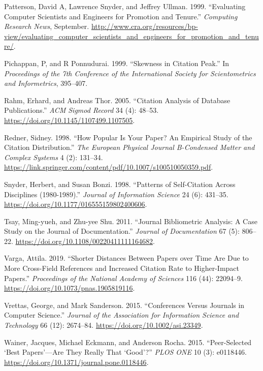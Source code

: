 \documentclass{article}
\begin{document}
\leavevmode\hypertarget{ref-patterson99:evaluating}{}%
Patterson, David A, Lawrence Snyder, and Jeffrey Ullman. 1999. ``Evaluating Computer Scientists and Engineers for Promotion and Tenure.'' \emph{Computing Research News}, September. \url{http://www.cra.org/resources/bp-view/evaluating_computer_scientists_and_engineers_for_promotion_and_tenure/}.

\leavevmode\hypertarget{ref-pichappan99:skewness}{}%
Pichappan, P, and R Ponnudurai. 1999. ``Skewness in Citation Peak.'' In \emph{Proceedings of the 7th Conference of the International Society for Scientometrics and Informetrics}, 395--407.

\leavevmode\hypertarget{ref-rahm05:citation}{}%
Rahm, Erhard, and Andreas Thor. 2005. ``Citation Analysis of Database Publications.'' \emph{ACM Sigmod Record} 34 (4): 48--53. \url{https://doi.org/10.1145/1107499.1107505}.

\leavevmode\hypertarget{ref-redner98:popular}{}%
Redner, Sidney. 1998. ``How Popular Is Your Paper? An Empirical Study of the Citation Distribution.'' \emph{The European Physical Journal B-Condensed Matter and Complex Systems} 4 (2): 131--34. \url{https://link.springer.com/content/pdf/10.1007/s100510050359.pdf}.

\leavevmode\hypertarget{ref-snyder98:patterns}{}%
Snyder, Herbert, and Susan Bonzi. 1998. ``Patterns of Self-Citation Across Disciplines (1980-1989).'' \emph{Journal of Information Science} 24 (6): 431--35. \url{https://doi.org/10.1177/016555159802400606}.

\leavevmode\hypertarget{ref-tsay11:journal}{}%
Tsay, Ming-yueh, and Zhu-yee Shu. 2011. ``Journal Bibliometric Analysis: A Case Study on the Journal of Documentation.'' \emph{Journal of Documentation} 67 (5): 806--22. \url{https://doi.org/10.1108/00220411111164682}.

\leavevmode\hypertarget{ref-varga19:shorter}{}%
Varga, Attila. 2019. ``Shorter Distances Between Papers over Time Are Due to More Cross-Field References and Increased Citation Rate to Higher-Impact Papers.'' \emph{Proceedings of the National Academy of Sciences} 116 (44): 22094--9. \url{https://doi.org/10.1073/pnas.1905819116}.

\leavevmode\hypertarget{ref-vrettas15:conferences}{}%
Vrettas, George, and Mark Sanderson. 2015. ``Conferences Versus Journals in Computer Science.'' \emph{Journal of the Association for Information Science and Technology} 66 (12): 2674--84. \url{https://doi.org/10.1002/asi.23349}.

\leavevmode\hypertarget{ref-wainer15:peer}{}%
Wainer, Jacques, Michael Eckmann, and Anderson Rocha. 2015. ``Peer-Selected `Best Papers'---Are They Really That `Good'?'' \emph{PLOS ONE} 10 (3): e0118446. \url{https://doi.org/10.1371/journal.pone.0118446}.
\end{document}
